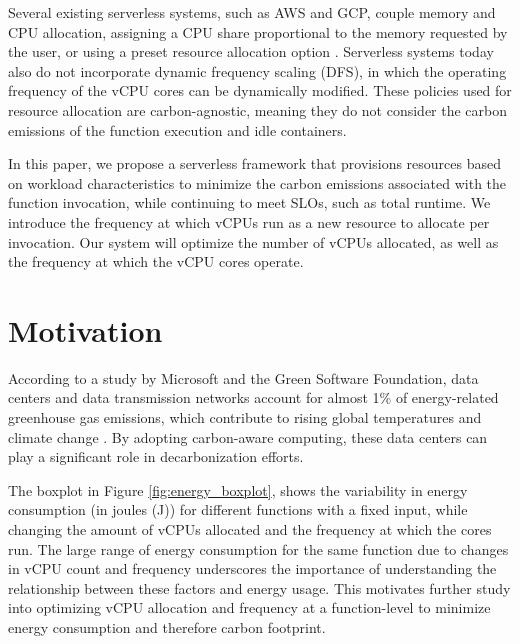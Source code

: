 \documentclass[times, 10pt,twocolumn]{article}
\begin{document}
Several existing serverless systems, such as AWS and GCP, couple memory and CPU allocation, assigning a CPU share proportional to the memory requested by the user, or using a preset resource allocation option \cite{bibal2023acm}. Serverless systems today also do not incorporate dynamic frequency scaling (DFS), in which the operating frequency of the vCPU cores can be dynamically modified. These policies used for resource allocation are carbon-agnostic, meaning they do not consider the carbon emissions of the function execution and idle containers.

In this paper, we propose a serverless framework that provisions resources based on workload characteristics to minimize the carbon emissions associated with the function invocation, while continuing to meet SLOs, such as total runtime. We introduce the frequency at which vCPUs run as a new resource to allocate per invocation. Our system will optimize the number of vCPUs allocated, as well as the frequency at which the vCPU cores operate. 

\section{Motivation}

According to a study by Microsoft and the Green Software Foundation, data centers and data transmission networks account for almost 1\% of energy-related greenhouse gas emissions, which contribute to rising global temperatures and climate change \cite{carbon_aware_computing}. By adopting carbon-aware computing, these data centers can play a significant role in decarbonization efforts. 



The boxplot in Figure \ref{fig:energy_boxplot}, 
shows the variability in energy consumption (in joules (J)) for different functions with a fixed input, while changing the amount of vCPUs allocated and the frequency at which the cores run. The large range of energy consumption for the same function due to changes in vCPU count and frequency underscores the importance of understanding the relationship between these factors and energy usage. This motivates further study into optimizing vCPU allocation and frequency at a function-level to minimize energy consumption and therefore carbon footprint. 
\end{document}
